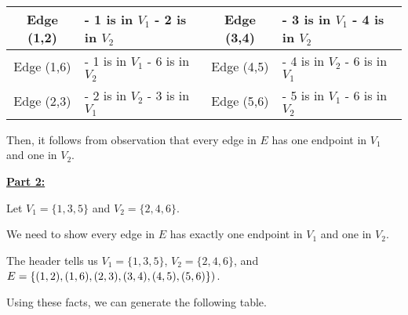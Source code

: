 \documentclass[12pt]{article}
\begin{document}
\begin{enumerate}[a.]
\begin{mdframed}
\begin{enumerate}[1.]
\begin{mdframed}
            \begin{tabular}{|c|p{3cm}|c|p{3cm}|}
                \hline
                Edge (1,2) & - 1 is in $V_1$ \newline - 2 is in $V_2$ & Edge (3,4) & - 3 is in $V_1$ \newline - 4 is in $V_2$\\
                \hline
                Edge (1,6) & - 1 is in $V_1$ \newline - 6 is in $V_2$ & Edge (4,5) & - 4 is in $V_2$ \newline - 6 is in $V_1$\\
                \hline
                Edge (2,3) & - 2 is in $V_2$ \newline - 3 is in $V_1$ & Edge (5,6) & - 5 is in $V_1$ \newline - 6 is in $V_2$\\
                \hline
            \end{tabular}

            \bigskip

            Then, it follows from observation that every edge in $E$ has
            one endpoint in $V_1$ and one in $V_2$.

            \end{mdframed}

            \bigskip

            \begin{mdframed}

            \underline{\textbf{Part 2:}}

            \bigskip

            Let $V_1 = \{1,3,5\}$ and $V_2 = \{2,4,6\}$.

            \bigskip

            We need to show every edge in $E$ has exactly one endpoint in $V_1$ and
            one in $V_2$.

            \bigskip

            The header tells us $V_1 = \{1,3,5\}$, $V_2 = \{2,4,6\}$,
            and $E = \{(1,2),(1,6),(2,3),\\(3,4),(4,5),(5,6)\})$.

            \bigskip

            Using these facts, we can generate the following table.

            \bigskip


\end{mdframed}
\end{enumerate}
\end{mdframed}
\end{enumerate}
\end{document}
